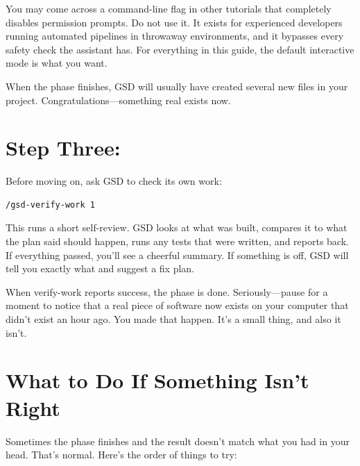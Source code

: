 \documentclass[11pt,letterpaper,openany]{book}
\begin{document}
\begin{gsdwarning}
You may come across a command-line flag in other tutorials that
completely disables permission prompts. Do not use it. It exists for
experienced developers running automated pipelines in throwaway
environments, and it bypasses every safety check the assistant has. For
everything in this guide, the default interactive mode is what you
want.
\end{gsdwarning}

When the phase finishes, GSD will usually have created several new
files in your project. Congratulations---something real exists now.

\section{Step Three: }

Before moving on, ask GSD to check its own work:

\begin{lstlisting}
/gsd-verify-work 1
\end{lstlisting}

This runs a short self-review. GSD looks at what was built, compares
it to what the plan said should happen, runs any tests that were
written, and reports back. If everything passed, you'll see a cheerful
summary. If something is off, GSD will tell you exactly what and
suggest a fix plan.

\begin{gsdsuccess}
When verify-work reports success, the phase is done. Seriously---pause
for a moment to notice that a real piece of software now exists on your
computer that didn't exist an hour ago. You made that happen. It's a
small thing, and also it isn't.
\end{gsdsuccess}

\section{What to Do If Something Isn't Right}

Sometimes the phase finishes and the result doesn't match what you
had in your head. That's normal. Here's the order of things to try:
\end{document}
